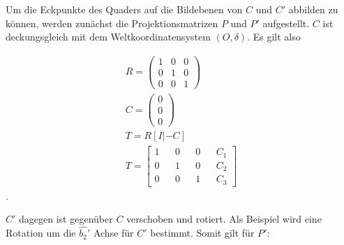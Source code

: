 
%
Um die Eckpunkte des Quaders auf die Bildebenen von $C$ und $C'$ abbilden zu können, werden zunächst die Projektionsmatrizen $P$ und $P'$ aufgestellt. $C$ ist deckungsgleich mit dem Weltkoordinatensystem $(O,\delta)$. Es gilt also

\begin{gather}
R=\begin{pmatrix}
1&0&0\\
0&1&0\\
0&0&1
\end{pmatrix}\\
C=\begin{pmatrix}
0\\0\\0
\end{pmatrix}\\
T = R[I|-C]\\
T = \begin{bmatrix}
1&&0&&0&&C_1\\
0&&1&&0&&C_2\\
0&&0&&1&&C_3
\end{bmatrix}
\end{gather}. 

$C'$ dagegen ist gegenüber $C$ verschoben und rotiert. Als Beispiel wird eine Rotation um die $\hat{b_2}'$ Achse für $C'$ bestimmt. Somit gilt für $P'$:







